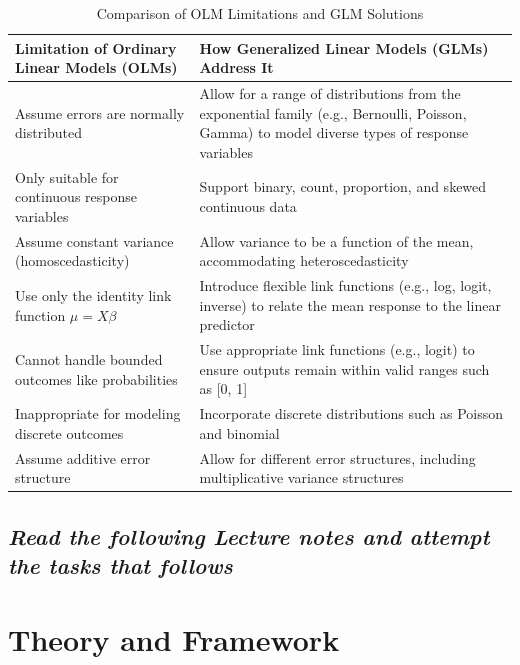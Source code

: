 \documentclass[12pt,a4paper]{article}
\begin{document}
\begin{table}[h!]
\centering
\renewcommand{\arraystretch}{1.5}
\begin{tabular}{|p{6.5cm}|p{7.5cm}|}
\hline
\textbf{Limitation of Ordinary Linear Models (OLMs)} & \textbf{How Generalized Linear Models (GLMs) Address It} \\
\hline
Assume errors are normally distributed & Allow for a range of distributions from the exponential family (e.g., Bernoulli, Poisson, Gamma) to model diverse types of response variables \\
\hline
Only suitable for continuous response variables & Support binary, count, proportion, and skewed continuous data \\
\hline
Assume constant variance (homoscedasticity) & Allow variance to be a function of the mean, accommodating heteroscedasticity \\
\hline
Use only the identity link function \( \mu = X\beta \) & Introduce flexible link functions (e.g., log, logit, inverse) to relate the mean response to the linear predictor \\
\hline
Cannot handle bounded outcomes like probabilities & Use appropriate link functions (e.g., logit) to ensure outputs remain within valid ranges such as [0, 1] \\
\hline
Inappropriate for modeling discrete outcomes & Incorporate discrete distributions such as Poisson and binomial \\
\hline
Assume additive error structure & Allow for different error structures, including multiplicative variance structures \\
\hline
\end{tabular}
\caption{Comparison of OLM Limitations and GLM Solutions}
\end{table}


\subsection*{\textit{Read the following Lecture notes and attempt the tasks that follows} }

\section{Theory and Framework}
\end{document}
